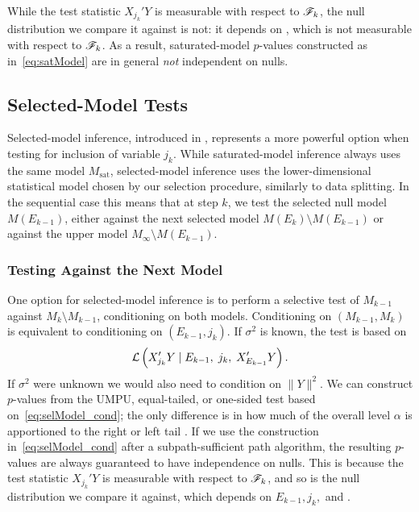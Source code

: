 \documentclass{article}
\begin{document}
While the test statistic $X_{j_k}'Y$ is measurable with respect to $\mathscr{F}_k$, the null distribution we compare it against is not: it depends on , which is not measurable with respect to $\mathscr{F}_k$. As a result, saturated-model $p$-values constructed as in~\eqref{eq:satModel} are in general {\em not} independent on nulls.

\subsection{Selected-Model Tests}
Selected-model inference, introduced in \citet{fithian2014optimal},
represents a more powerful option when testing for inclusion of variable $j_k$. While saturated-model inference always uses the same model $M_{\text{sat}}$, selected-model inference uses the lower-dimensional statistical model chosen by our selection procedure, similarly to data splitting. In the sequential case this means that at step $k$, we test the selected null model $M(E_{k-1})$, either against the next selected model $M(E_k)\setminus M(E_{k-1})$ or against the upper model $M_\infty\setminus M(E_{k-1})$.

\subsubsection{Testing Against the Next Model}\label{sec:identify}
One option for selected-model inference is to perform a selective test of $M_{k-1}$ against $M_{k}\setminus M_{k-1}$, conditioning on both models. Conditioning on $(M_{k-1},M_k)$ is equivalent to conditioning on $(E_{k-1}, j_k)$. If $\sigma^2$ is known, the test is based on
\begin{equation}\label{eq:selModel_cond}
\mathcal{L}\left(X_{j_k}'Y \mid E_{k-1}, \; j_k, \; X_{E_{k-1}}'Y\right).
\end{equation}
If $\sigma^2$ were unknown we would also need to condition on $\|Y\|^2$. We can construct $p$-values from the UMPU, equal-tailed, or one-sided test based on~\eqref{eq:selModel_cond}; the only difference is in how much of the overall level $\alpha$ is apportioned to the right or left tail \citep{fithian2014optimal}. If we use the construction in~\eqref{eq:selModel_cond} after a subpath-sufficient path algorithm, the resulting $p$-values are always guaranteed to have independence on nulls. This is because the test statistic $X_{j_k}'Y$ is measurable with respect to $\mathscr{F}_k$, and so is the null distribution we compare it against, which depends on $E_{k-1}, j_k,$ and .
\end{document}
